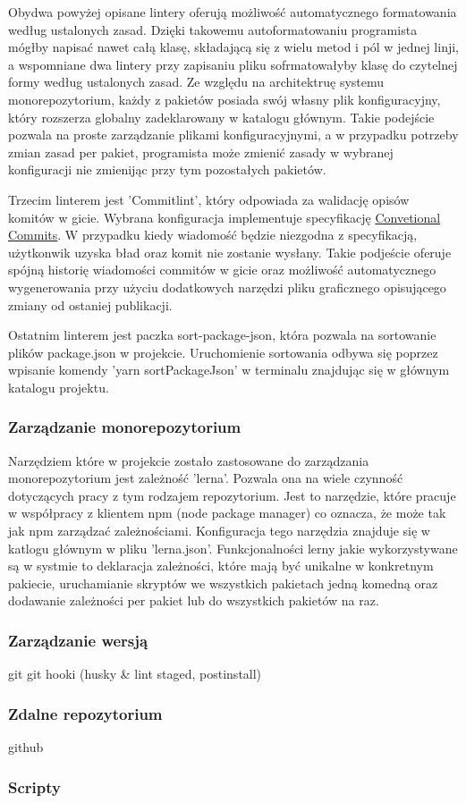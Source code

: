 Obydwa powyżej opisane lintery oferują możliwość automatycznego formatowania według ustalonych zasad. Dzięki takowemu autoformatowaniu programista mógłby napisać nawet całą klasę, składającą się z wielu metod i pól w jednej linji, a wspomniane dwa lintery przy zapisaniu pliku sofrmatowałyby klasę do czytelnej formy według ustalonych zasad. Ze względu na architektruę systemu monorepozytorium, każdy z pakietów posiada swój własny plik konfiguracyjny, który rozszerza globalny zadeklarowany w katalogu głównym. Takie podejście pozwala na proste zarządzanie plikami konfiguracyjnymi, a w przypadku potrzeby zmian zasad per pakiet, programista może zmienić zasady w wybranej konfiguracji nie zmienijąc przy tym pozostałych pakietów.

Trzecim linterem jest 'Commitlint', który odpowiada za walidację opisów komitów w gicie. Wybrana konfiguracja implementuje specyfikację \href{https://www.conventionalcommits.org/en/v1.0.0/#specification}{Convetional Commits}. W przypadku kiedy wiadomość będzie niezgodna z specyfikacją, użytkonwik uzyska bład oraz komit nie zostanie wysłany. Takie podjeście oferuje spójną historię wiadomości commitów w gicie oraz możliwość automatycznego wygenerowania przy użyciu dodatkowych narzędzi pliku graficznego opisującego zmiany od ostaniej publikacji.

Ostatnim linterem jest paczka sort-package-json, która pozwala na sortowanie plików package.json w projekcie. Uruchomienie sortowania odbywa się poprzez wpisanie komendy 'yarn sortPackageJson' w terminalu znajdując się w głównym katalogu projektu. 

\subsubsection{Zarządzanie monorepozytorium}
Narzędziem które w projekcie zostało zastosowane do zarządzania monorepozytorium jest zależność 'lerna'. Pozwala ona na wiele czynność dotyczących pracy z tym rodzajem repozytorium. Jest to narzędzie, które pracuje w współpracy z klientem npm (node package manager) co oznacza, że może tak jak npm zarządzać zależnościami. Konfiguracja tego narzędzia znajduje się w katlogu głównym w pliku 'lerna.json'. Funkcjonalności lerny jakie wykorzystywane są w systmie to deklaracja zależności, które mają być unikalne w konkretnym pakiecie, uruchamianie skryptów we wszystkich pakietach jedną komedną oraz dodawanie zależności per pakiet lub do wszystkich pakietów na raz.


\subsubsection{Zarządzanie wersją}
git
git hooki (husky \& lint staged, postinstall)

\subsubsection{Zdalne repozytorium}
github


\subsubsection{Scripty}